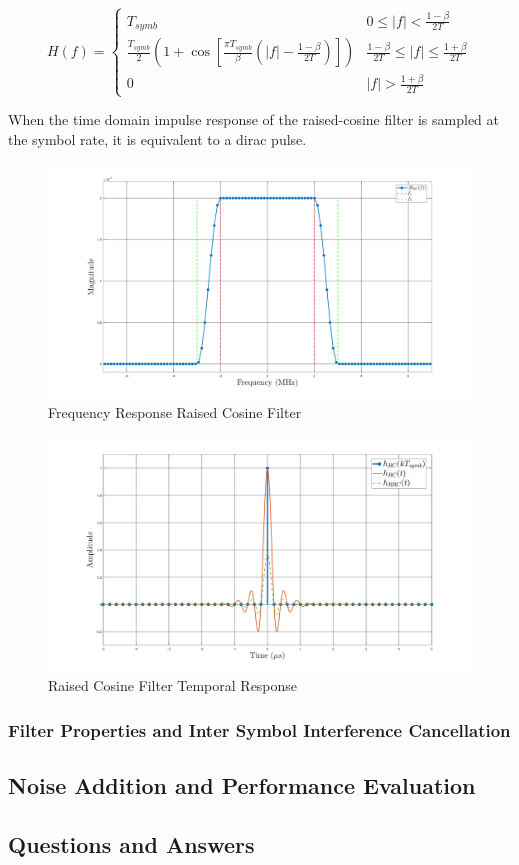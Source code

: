 \begin{equation}
	H(f) = \begin{cases}
		T_{symb} & 0 \le |f| < \frac{1-\beta}{2T} \\
		\frac{T_{symb}}{2} \left(1 + \cos\left[\frac{\pi T_{symb}}{\beta}\left(|f| - \frac{1-\beta}{2T}\right)\right]\right) & \frac{1-\beta}{2T} \le |f| \le \frac{1+\beta}{2T} \\
		0 & |f| > \frac{1+\beta}{2T}
	\end{cases}
\end{equation}

When the time domain impulse response of the raised-cosine filter is sampled at the symbol rate, it is equivalent to a dirac pulse.
\begin{figure}[H]
	\centering
	\includegraphics[width=\linewidth]{Images/h-rc-freq}
	\caption{Frequency Response Raised Cosine Filter}
	\label{fig:h-rc-freq}
\end{figure}
\begin{figure}[H]
	\centering
	\includegraphics[width=\linewidth]{Images/h-rc}
	\caption{Raised Cosine Filter Temporal Response}
	\label{fig:h-rc}
\end{figure}




\subsubsection{Filter Properties and Inter Symbol Interference Cancellation}
\subsection{Noise Addition and Performance Evaluation}
\subsection{Questions and Answers}